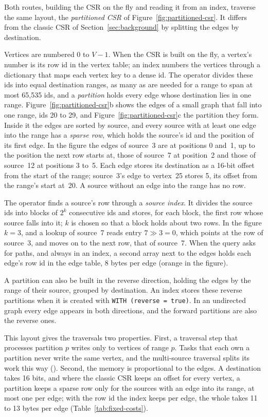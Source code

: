 Both routes, building the CSR on the fly and reading it from an index, traverse the same layout, the
\emph{partitioned CSR} of Figure~\ref{fig:partitioned-csr}. It differs from the classic CSR of Section~\ref{sec:background}
by splitting the edges by destination.

Vertices are numbered $0$ to $V-1$. When the CSR is built on the fly, a vertex's number is its row id in the vertex
table; an index numbers the vertices through a dictionary that maps each vertex key to a dense id. The operator
divides these ids into equal destination ranges, as many as are needed for a range to span at most 65,535 ids, and a
\emph{partition} holds every edge whose destination lies in one range. Figure~\ref{fig:partitioned-csr}b shows the
edges of a small graph that fall into one range, ids 20 to 29, and Figure~\ref{fig:partitioned-csr}c the partition they form. Inside it the edges are sorted by source, and every source with at least one edge into the range has a
\emph{sparse row}, which holds the source's id and the position of its first edge. In the figure the edges of
source~3 are at positions 0 and~1, up to the position the next row starts at, those of source~7 at position~2 and
those of source~12 at positions 3 to~5. Each edge stores its destination as a 16-bit offset from the start of the
range; source~3's edge to vertex~25 stores 5, its offset from the range's start at~20. A source without an edge into the
range has no row.

The operator finds a source's row through a \emph{source index}. It divides the source ids into
blocks of $2^k$ consecutive ids and stores, for each block, the first row whose source falls into it; $k$ is chosen
so that a block holds about two rows. In the figure $k = 3$, and a lookup of source~7 reads entry $7 \gg 3 = 0$, which
points at the row of source~3, and moves on to the next row, that of source~7. When the query asks for paths, and
always in an index, a second array next to the edges holds each edge's row id in the edge table, 8 bytes per edge
(orange in the figure).

A partition can also be built in the reverse direction, holding the edges by the range of their source, grouped by
destination. An index stores these reverse partitions when it is created with \texttt{WITH (reverse = true)}. In an
undirected graph every edge appears in both directions, and the forward partitions are also the reverse ones.

This layout gives the traversals two properties. First, a traversal step that processes partition $p$ writes only to
vertices of range $p$. Tasks that each own a partition never write the same vertex, and the multi-source
traversal splits its work this way (). Second, the memory is proportional to the edges. A destination takes 16 bits, and where the classic CSR keeps an offset for every vertex, a partition keeps
a sparse row only for the sources with an edge into its range, at most one per edge; with the row id the index keeps per edge, the whole takes 11 to 13 bytes per edge (Table~\ref{tab:fixed-costs}).

